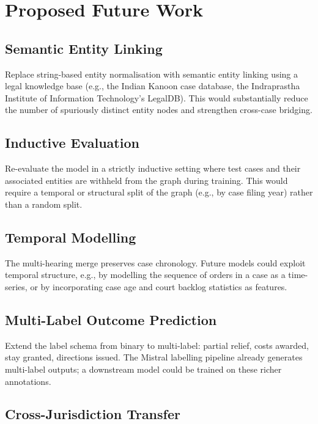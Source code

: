 \documentclass[12pt,a4paper]{report}
\begin{document}
\section{Proposed Future Work}
\label{sec:future_work}

\subsection{Semantic Entity Linking}

Replace string-based entity normalisation with semantic entity linking using a legal knowledge base (e.g., the Indian Kanoon case database, the Indraprastha Institute of Information Technology's LegalDB). This would substantially reduce the number of spuriously distinct entity nodes and strengthen cross-case bridging.

\subsection{Inductive Evaluation}

Re-evaluate the model in a strictly inductive setting where test cases and their associated entities are withheld from the graph during training. This would require a temporal or structural split of the graph (e.g., by case filing year) rather than a random split.

\subsection{Temporal Modelling}

The multi-hearing merge preserves case chronology. Future models could exploit temporal structure, e.g., by modelling the sequence of orders in a case as a time-series, or by incorporating case age and court backlog statistics as features.

\subsection{Multi-Label Outcome Prediction}

Extend the label schema from binary to multi-label: partial relief, costs awarded, stay granted, directions issued. The Mistral labelling pipeline already generates multi-label outputs; a downstream model could be trained on these richer annotations.

\subsection{Cross-Jurisdiction Transfer}
\end{document}
